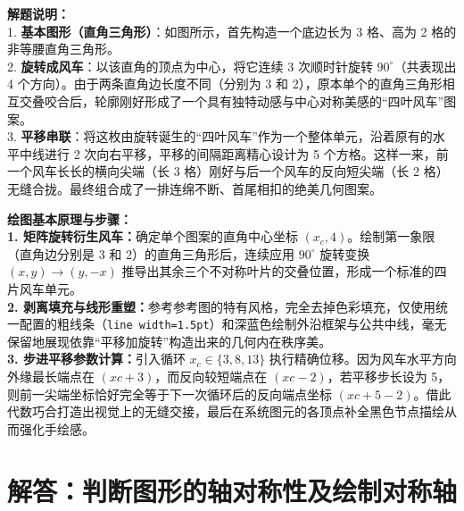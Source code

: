 \vspace{0.6cm}

{\small\color{gray}
\textbf{解题说明：}\\
1. \textbf{基本图形（直角三角形）}：如图所示，首先构造一个底边长为 3 格、高为 2 格的非等腰直角三角形。\\
2. \textbf{旋转成风车}：以该直角的顶点为中心，将它连续 3 次顺时针旋转 $90^\circ$（共表现出 4 个方向）。由于两条直角边长度不同（分别为 3 和 2），原本单个的直角三角形相互交叠咬合后，轮廓刚好形成了一个具有独特动感与中心对称美感的“四叶风车”图案。\\
3. \textbf{平移串联}：将这枚由旋转诞生的“四叶风车”作为一个整体单元，沿着原有的水平中线进行 2 次向右平移，平移的间隔距离精心设计为 5 个方格。这样一来，前一个风车长长的横向尖端（长 3 格）刚好与后一个风车的反向短尖端（长 2 格）无缝合拢。最终组合成了一排连绵不断、首尾相扣的绝美几何图案。
}

\vspace{0.6cm}

{\small\color{blue!70!black}
\textbf{绘图基本原理与步骤：}\\
\textbf{1. 矩阵旋转衍生风车：}确定单个图案的直角中心坐标 $(x_c, 4)$。绘制第一象限（直角边分别是 3 和 2）的直角三角形后，连续应用 $90^\circ$ 旋转变换 $(x,y) \to (y,-x)$ 推导出其余三个不对称叶片的交叠位置，形成一个标准的四片风车单元。\\
\textbf{2. 剥离填充与线形重塑：}参考参考图的特有风格，完全去掉色彩填充，仅使用统一配置的粗线条（\texttt{line width=1.5pt}）和深蓝色绘制外沿框架与公共中线，毫无保留地展现依靠“平移加旋转”构造出来的几何内在秩序美。\\
\textbf{3. 步进平移参数计算：}引入循环 $x_c \in \{3, 8, 13\}$ 执行精确位移。因为风车水平方向外缘最长端点在 $(xc+3)$，而反向较短端点在 $(xc-2)$，若平移步长设为 5，则前一尖端坐标恰好完全等于下一次循环后的反向端点坐标 $(xc+5-2)$。借此代数巧合打造出视觉上的无缝交接，最后在系统图元的各顶点补全黑色节点描绘从而强化手绘感。
}

\newpage


\newpage

\section{解答：判断图形的轴对称性及绘制对称轴}

\vspace{0.6cm}

